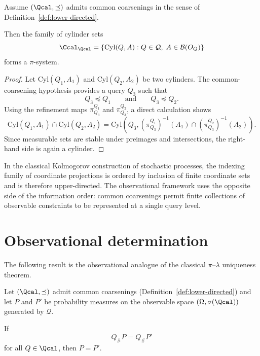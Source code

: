 \begin{lemma}
\label{lem:cyl-pisystem}
Assume $(\Qcal,\preceq)$ admits common coarsenings in the sense of
Definition~\ref{def:lower-directed}.

Then the family of cylinder sets
\[
\Ccal_{\Qcal}
=
\{\mathrm{Cyl}(Q,A) : Q\in\mathcal Q,\; A\in\mathcal B(O_Q)\}
\]
forms a $\pi$-system.
\end{lemma}

\begin{proof}
Let $\mathrm{Cyl}(Q_1,A_1)$ and $\mathrm{Cyl}(Q_2,A_2)$ be two cylinders.
The common-coarsening hypothesis provides a query $Q_3$ such that
\[
Q_3 \preceq Q_1
\qquad\text{and}\qquad
Q_3 \preceq Q_2 .
\]
Using the refinement maps
$\pi^{Q_1}_{Q_3}$ and $\pi^{Q_2}_{Q_3}$, a direct calculation shows
\[
\mathrm{Cyl}(Q_1,A_1)\cap\mathrm{Cyl}(Q_2,A_2)
=
\mathrm{Cyl}\!\left(
Q_3,
(\pi^{Q_1}_{Q_3})^{-1}(A_1)
\cap
(\pi^{Q_2}_{Q_3})^{-1}(A_2)
\right).
\]
Since measurable sets are stable under preimages and intersections,
the right-hand side is again a cylinder.
\end{proof}

\begin{remark}
In the classical Kolmogorov construction of stochastic processes, the
indexing family of coordinate projections is ordered by inclusion of
finite coordinate sets and is therefore upper-directed. The
observational framework uses the opposite side of the information order:
common coarsenings permit finite collections of observable constraints
to be represented at a single query level.
\end{remark}


\section{Observational determination}

The following result is the observational analogue of the classical
$\pi$--$\lambda$ uniqueness theorem.

\begin{theorem}
\label{thm:obs-determination}
Let $(\Qcal,\preceq)$ admit common coarsenings (Definition~\ref{def:lower-directed}) and let
$P$ and $P'$ be probability measures on the observable space
$(\Omega,\sigma(\Qcal))$ generated by $\mathcal Q$.

If
\[
Q_\# P = Q_\# P'
\]
for all $Q \in \Qcal$, then $P = P'$.
\end{theorem}

